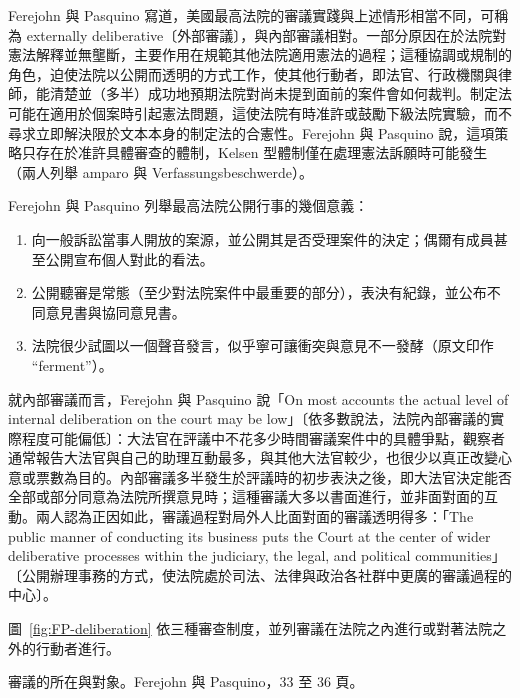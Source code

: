 Ferejohn 與 Pasquino 寫道，美國最高法院的審議實踐與上述情形相當不同，可稱為 externally deliberative〔外部審議〕，與內部審議相對。一部分原因在於法院對憲法解釋並無壟斷，主要作用在規範其他法院適用憲法的過程；這種協調或規制的角色，迫使法院以公開而透明的方式工作，使其他行動者，即法官、行政機關與律師，能清楚並（多半）成功地預期法院對尚未提到面前的案件會如何裁判。制定法可能在適用於個案時引起憲法問題，這使法院有時准許或鼓勵下級法院實驗，而不尋求立即解決限於文本本身的制定法的合憲性。Ferejohn 與 Pasquino 說，這項策略只存在於准許具體審查的體制，Kelsen 型體制僅在處理憲法訴願時可能發生（兩人列舉 amparo 與 Verfassungsbeschwerde）。

Ferejohn 與 Pasquino 列舉最高法院公開行事的幾個意義：

\begin{enumerate}
\def\labelenumi{\arabic{enumi}.}
\tightlist
\item
  向一般訴訟當事人開放的案源，並公開其是否受理案件的決定；偶爾有成員甚至公開宣布個人對此的看法。
\item
  公開聽審是常態（至少對法院案件中最重要的部分），表決有紀錄，並公布不同意見書與協同意見書。
\item
  法院很少試圖以一個聲音發言，似乎寧可讓衝突與意見不一發酵（原文印作 ``ferment''）。
\end{enumerate}

就內部審議而言，Ferejohn 與 Pasquino 說「On most accounts the actual level of internal deliberation on the court may be low」〔依多數說法，法院內部審議的實際程度可能偏低〕：大法官在評議中不花多少時間審議案件中的具體爭點，觀察者通常報告大法官與自己的助理互動最多，與其他大法官較少，也很少以真正改變心意或票數為目的。內部審議多半發生於評議時的初步表決之後，即大法官決定能否全部或部分同意為法院所撰意見時；這種審議大多以書面進行，並非面對面的互動。兩人認為正因如此，審議過程對局外人比面對面的審議透明得多：「The public manner of conducting its business puts the Court at the center of wider deliberative processes within the judiciary, the legal, and political communities」〔公開辦理事務的方式，使法院處於司法、法律與政治各社群中更廣的審議過程的中心〕。

圖~\ref{fig:FP-deliberation} 依三種審查制度，並列審議在法院之內進行或對著法院之外的行動者進行。

\begin{qafigure}[審議的所在與對象]{審議的所在與對象。Ferejohn 與 Pasquino，33 至 36 頁。\label{fig:FP-deliberation}}

\end{qafigure}
